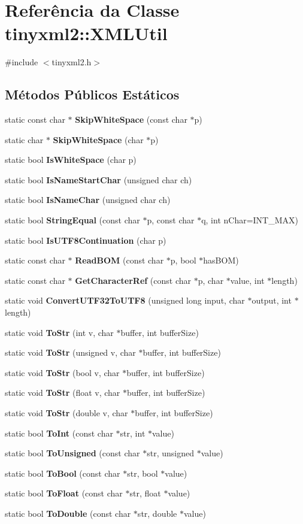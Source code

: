 \section{Referência da Classe tinyxml2\+:\+:X\+M\+L\+Util}
\label{classtinyxml2_1_1_x_m_l_util}


{\ttfamily \#include $<$tinyxml2.\+h$>$}

\subsection*{Métodos Públicos Estáticos}
\begin{DoxyCompactItemize}
\item 
static const char $\ast$ {\bf Skip\+White\+Space} (const char $\ast$p)
\item 
static char $\ast$ {\bf Skip\+White\+Space} (char $\ast$p)
\item 
static bool {\bf Is\+White\+Space} (char p)
\item 
static bool {\bf Is\+Name\+Start\+Char} (unsigned char ch)
\item 
static bool {\bf Is\+Name\+Char} (unsigned char ch)
\item 
static bool {\bf String\+Equal} (const char $\ast$p, const char $\ast$q, int n\+Char=I\+N\+T\+\_\+\+M\+AX)
\item 
static bool {\bf Is\+U\+T\+F8\+Continuation} (char p)
\item 
static const char $\ast$ {\bf Read\+B\+OM} (const char $\ast$p, bool $\ast$has\+B\+OM)
\item 
static const char $\ast$ {\bf Get\+Character\+Ref} (const char $\ast$p, char $\ast$value, int $\ast$length)
\item 
static void {\bf Convert\+U\+T\+F32\+To\+U\+T\+F8} (unsigned long input, char $\ast$output, int $\ast$length)
\item 
static void {\bf To\+Str} (int v, char $\ast$buffer, int buffer\+Size)
\item 
static void {\bf To\+Str} (unsigned v, char $\ast$buffer, int buffer\+Size)
\item 
static void {\bf To\+Str} (bool v, char $\ast$buffer, int buffer\+Size)
\item 
static void {\bf To\+Str} (float v, char $\ast$buffer, int buffer\+Size)
\item 
static void {\bf To\+Str} (double v, char $\ast$buffer, int buffer\+Size)
\item 
static bool {\bf To\+Int} (const char $\ast$str, int $\ast$value)
\item 
static bool {\bf To\+Unsigned} (const char $\ast$str, unsigned $\ast$value)
\item 
static bool {\bf To\+Bool} (const char $\ast$str, bool $\ast$value)
\item 
static bool {\bf To\+Float} (const char $\ast$str, float $\ast$value)
\item 
static bool {\bf To\+Double} (const char $\ast$str, double $\ast$value)
\end{DoxyCompactItemize}



